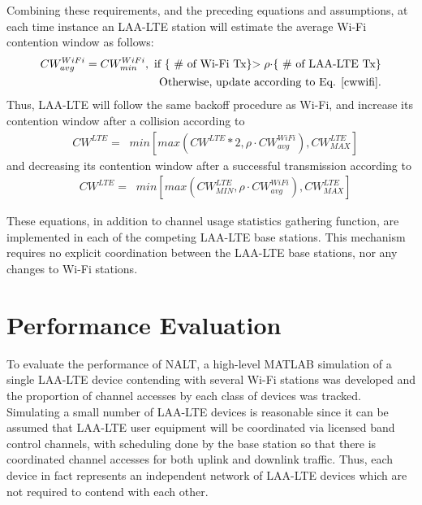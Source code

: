 Combining these requirements, and the preceding equations and assumptions, at each time instance an \mbox{LAA-LTE} station will estimate the average \mbox{Wi-Fi} contention window as follows:
\begin{align}
CW^{WiFi}_{avg} = CW^{WiFi}_{min}, \text{  if \{ \# of \mbox{Wi-Fi} Tx\}$> \rho\cdot$\{  \# of \mbox{LAA-LTE} Tx\}}\notag\\ 
\text{Otherwise, update according to Eq. \ref{cwwifi}.}
\end{align}
Thus, \mbox{LAA-LTE} will follow the same backoff procedure as \mbox{Wi-Fi}, and increase its contention window after a collision according to
\begin{align}
&CW^{LTE}=\;\;min\left[max\left(CW^{LTE}*2,\rho \cdot CW^{WiFi}_{avg}\right), CW^{LTE}_{MAX}\right]
\end{align}
and decreasing its contention window after a successful transmission according to 
\begin{align}
&CW^{LTE}=\;\;min\left[max\left(CW^{LTE}_{MIN},\rho \cdot CW^{WiFi}_{avg}\right), CW^{LTE}_{MAX}\right]
\end{align}

These equations, in addition to channel usage statistics gathering function, are implemented in each of the competing LAA-LTE base stations.  This mechanism requires no explicit coordination between the LAA-LTE base stations, nor any changes to Wi-Fi stations.

\section{Performance Evaluation}\label{perf-eval}
To evaluate the performance of NALT, a high-level MATLAB simulation of a single \mbox{LAA-LTE} device contending with several \mbox{Wi-Fi} stations was developed and the proportion of channel accesses by each class of devices was tracked.  Simulating a small number of \mbox{LAA-LTE} devices is reasonable since it can be assumed that \mbox{LAA-LTE} user equipment will be coordinated via licensed band control channels, with scheduling done by the base station so that there is coordinated channel accesses for both uplink and downlink traffic.  Thus, each device in fact represents an independent network of LAA-LTE devices which are not required to contend with each other.


